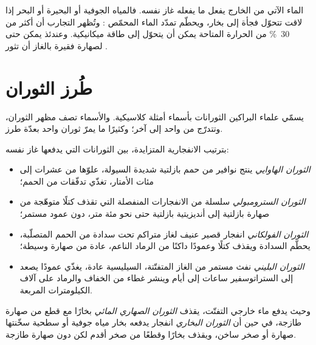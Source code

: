 الماء الآتي من الخارج يفعل ما يفعله غاز  نفسه. فالمياه الجوفية أو البحيرة أو
البحر إذا لاقت  تتحوّل فجأة إلى بخار، ويحطّم تمدّد الماء
المحمّص : وتُظهر التجارب أن أكثر من \qty{30}{\percent} من
الحرارة المتاحة يمكن أن يتحوّل إلى طاقة ميكانيكية. وعندئذ يمكن حتى لصهارة فقيرة بالغاز
أن تثور .

\section{طُرز الثوران}

يسمّي علماء البراكين الثورانات بأسماء أمثلة كلاسيكية. والأسماء تصف مظهر
الثوران، وتتدرّج من واحد إلى آخر؛ وكثيرًا ما يمرّ ثوران واحد
بعدّة طرز.

\begin{definition}\label{def:b2:eruptive-styles:styles}
بترتيب الانفجارية المتزايدة، بين الثورانات التي يدفعها غاز  نفسه:
\begin{itemize}
\item \emph{الثوران الهاوايي} ينتج نوافير من
حمم بازلتية شديدة السيولة، علوّها من عشرات إلى مئات الأمتار، تغذّي تدفّقات من الحمم؛
\item \emph{الثوران السترومبولي} سلسلة من
الانفجارات المنفصلة التي تقذف كتلًا متوهّجة من صهارة بازلتية إلى
أنديزيتية بازلتية حتى نحو مئة متر، دون عمود
مستمر؛
\item \emph{الثوران الفولكاني} انفجار قصير عنيف
لغاز متراكم تحت سدادة من الحمم المتصلّبة، يحطّم
السدادة ويقذف كتلًا وعمودًا داكنًا من الرماد الناعم، عادة من
صهارة وسيطة؛
\item \emph{الثوران البليني} نفث مستمر من الغاز
 المتفتّتة، السيليسية عادة، يغذّي عمودًا يصعد إلى
الستراتوسفير ساعات إلى أيام وينشر غطاء من الخفاف والرماد على
آلاف الكيلومترات المربعة.
\end{itemize}
وحيث يدفع ماء خارجي التفتّت، يقذف \emph{الثوران الصهاري
المائي} بخارًا مع قطع
من صهارة طازجة، في حين أن \emph{الثوران البخاري} انفجار
يدفعه بخار مياه جوفية أو سطحية سخّنتها صهارة أو صخر ساخن،
ويقذف بخارًا وقطعًا من صخر أقدم لكن دون صهارة طازجة.
\end{definition}

